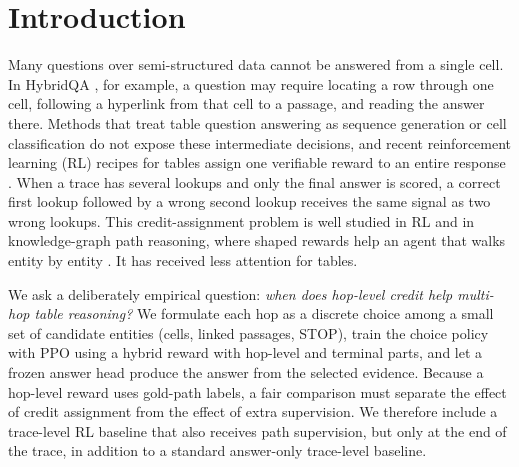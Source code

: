 \section{Introduction}
\label{sec:intro}

Many questions over semi-structured data cannot be answered from a single cell.
In HybridQA \citep{chen2020hybridqa}, for example, a question may require locating a row through one cell, following a hyperlink from that cell to a passage, and reading the answer there.
Methods that treat table question answering as sequence generation or cell classification \citep{herzig2020tapas,liu2022tapex,zhang2024tablellama} do not expose these intermediate decisions, and recent reinforcement learning (RL) recipes for tables assign one verifiable reward to an entire response \citep{yang2025tabler1,lei2025reasoningtable}.
When a trace has several lookups and only the final answer is scored, a correct first lookup followed by a wrong second lookup receives the same signal as two wrong lookups.
This credit-assignment problem is well studied in RL \citep{ng1999shaping,arjona2019rudder} and in knowledge-graph path reasoning, where shaped rewards help an agent that walks entity by entity \citep{xiong2017deeppath,das2018minerva,lin2018multihop}.
It has received less attention for tables.

We ask a deliberately empirical question: \emph{when does hop-level credit help multi-hop table reasoning?}
We formulate each hop as a discrete choice among a small set of candidate entities (cells, linked passages, STOP), train the choice policy with PPO \citep{schulman2017ppo} using a hybrid reward with hop-level and terminal parts, and let a frozen answer head produce the answer from the selected evidence.
Because a hop-level reward uses gold-path labels, a fair comparison must separate the effect of credit assignment from the effect of extra supervision.
We therefore include a trace-level RL baseline that also receives path supervision, but only at the end of the trace, in addition to a standard answer-only trace-level baseline.

